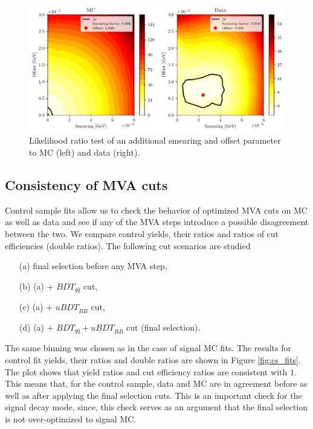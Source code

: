 \begin{figure}[H]
	\centering
	\captionsetup{width=0.8\linewidth}
	\includegraphics[width=\linewidth]{fig/smearing_offset}
	\caption{Likelihood ratio test of an additional smearing and offset parameter to MC (left) and data (right).}
	\label{fig:smearing_offset}
\end{figure}

\subsection{Consistency of MVA cuts}

Control sample fits allow us to check the behavior of optimized MVA cuts on MC as well as data and see if any of the MVA steps introduce a possible disagreement between the two. We compare control yields, their ratios and ratios of cut efficiencies (double ratios). The following cut scenarios are studied
\begin{itemize}
\item[(a)] final selection before any MVA step,
\item[(b)] (a) + $BDT_{q\bar q}$ cut,
\item[(c)] (a) + $uBDT_{B\bar B}$ cut,
\item[(d)] (a) + $BDT_{q\bar q} + uBDT_{B\bar B}$ cut (final selection).
\end{itemize}

The same binning was chosen as in the case of signal MC fits. The results for control fit yields, their ratios and double ratios are shown in Figure \ref{fig:cs_fits}. The plot shows that yield ratios and cut efficiency ratios are consistent with $1$. This means that, for the control sample, data and MC are in agreement before as well as after applying the final selection cuts. This is an important check for the signal decay mode, since, this check serves as an argument that the final selection is not over-optimized to signal MC.

